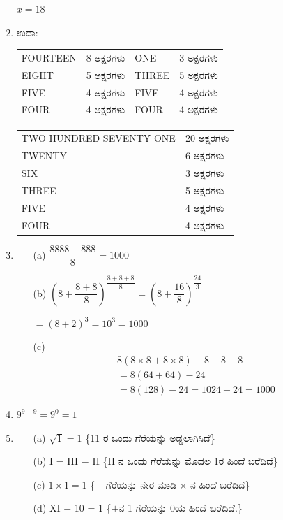 \begin{enumerate}
\vskip 0.1cm
$x = 18$

\item ಉದಾ: 

\begin{tabular}[t]{llll}
FOURTEEN & 8 ಅಕ್ಷರಗಳು & ONE & 3 ಅಕ್ಷರಗಳು\\
EIGHT & 5 ಅಕ್ಷರಗಳು  & THREE & 5 ಅಕ್ಷರಗಳು\\
FIVE & 4 ಅಕ್ಷರಗಳು  & FIVE & 4 ಅಕ್ಷರಗಳು\\
FOUR & 4 ಅಕ್ಷರಗಳು  & FOUR & 4 ಅಕ್ಷರಗಳು
\end{tabular}

\vskip 0.2cm

\begin{tabular}[t]{ll}
TWO HUNDRED SEVENTY ONE & 20 ಅಕ್ಷರಗಳು\\
TWENTY & 6 ಅಕ್ಷರಗಳು\\
SIX & 3 ಅಕ್ಷರಗಳು\\
THREE & 5 ಅಕ್ಷರಗಳು\\
FIVE & 4 ಅಕ್ಷರಗಳು\\
FOUR & 4 ಅಕ್ಷರಗಳು
\end{tabular}

\smallskip
\item 
\begin{itemize}
\item[(a)] $\dfrac{8888 - 888}{8} = 1000$
\item[(b)] $\left(8 + \dfrac{8 + 8}{8}\right)^{\dfrac{8+8+8}{8}} = \left(8 + \dfrac{16}{8}\right)^{\dfrac{24}{3}}$

\smallskip

$= (8 + 2)^{3} = 10^{3} = 1000$
\item[(c)] 
\begin{align*}
& 8(8\times 8 + 8\times 8) - 8 - 8 - 8\\
& = 8(64 + 64) - 24\\
& = 8(128) - 24 = 1024 - 24 = 1000
\end{align*}
\end{itemize}

\item $9^{9-9} = 9^{0} = 1$

\item 
\begin{itemize}
\item[(a)] $\sqrt{1} = 1$ \{11 ರ ಒಂದು ಗೆರೆಯನ್ನು ಅಡ್ಡಲಾಗಿಸಿದೆ\}
\item[(b)] I = III $-$ II \{II ನ ಒಂದು ಗೆರೆಯನ್ನು ಮೊದಲ 1ರ ಹಿಂದೆ ಬರೆದಿದೆ\}
\item[(c)] $1\times 1 = 1$ \{$-$ ಗೆರೆಯನ್ನು ನೇರ ಮಾಡಿ $\times$ ನ ಹಿಂದೆ ಬರೆದಿದೆ\}
\item[(d)] XI $-$ 10 = 1 \{$+$ನ 1 ಗೆರೆಯನ್ನು 0ಯ ಹಿಂದೆ ಬರೆದಿದೆ.\}
\end{itemize}


\end{enumerate}
